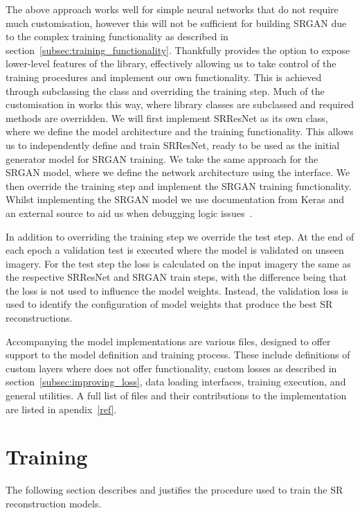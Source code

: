 The above approach works well for simple neural networks that do not require much customisation, however this will not be sufficient for building SRGAN due to the complex training functionality as described in section~\ref{subsec:training_functionality}. Thankfully  provides the option to expose lower-level features of the library, effectively allowing us to take control of the training procedures and implement our own functionality. This is achieved through subclassing the  class and overriding the training step. Much of the customisation in  works this way, where library classes are subclassed and required methods are overridden. We will first implement SRResNet as its own class, where we define the model architecture and the training functionality. This allows us to independently define and train SRResNet, ready to be used as the initial generator model for SRGAN training. We take the same approach for the SRGAN model, where we define the network architecture using the  interface. We then override the training step and implement the SRGAN training functionality. Whilst implementing the SRGAN model we use documentation from Keras and an external source to aid us when debugging logic issues~\cite{keras, srganImplementation}.

In addition to overriding the training step we override the test step. At the end of each epoch a validation test is executed where the model is validated on unseen imagery. For the test step the loss is calculated on the input imagery the same as the respective SRResNet and SRGAN train steps, with the difference being that the loss is not used to influence the model weights. Instead, the validation loss is used to identify the configuration of model weights that produce the best SR reconstructions.

Accompanying the model implementations are various  files, designed to offer support to the model definition and training process. These include definitions of custom layers where  does not offer functionality, custom losses as described in section~\ref{subsec:improving_loss}, data loading interfaces, training execution, and general utilities. A full list of  files and their contributions to the implementation are listed in apendix~\ref{ref}.

\section{Training}
The following section describes and justifies the procedure used to train the SR reconstruction models.

